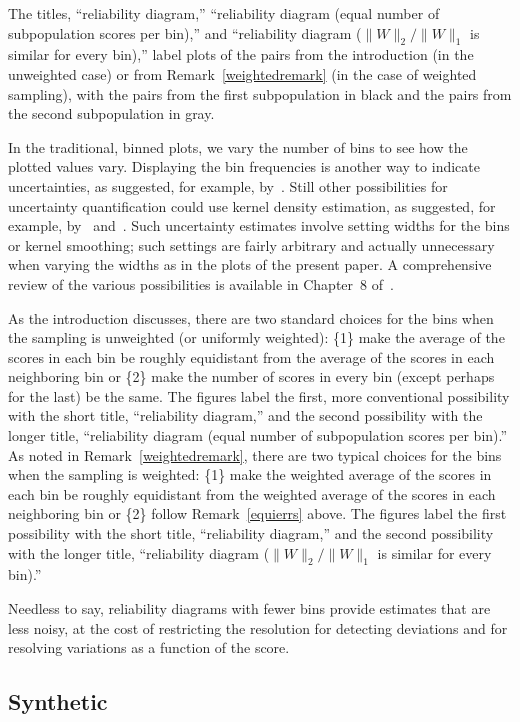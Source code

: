 \documentclass{article}
\begin{document}
The titles, ``reliability diagram,''
``reliability diagram (equal number of subpopulation scores per bin),''
and ``reliability diagram ($\|W\|_2/\|W\|_1$ is similar for every bin),''
label plots of the pairs from the introduction (in the unweighted case)
or from Remark~\ref{weightedremark} (in the case of weighted sampling),
with the pairs from the first subpopulation in black
and the pairs from the second subpopulation in gray.

In the traditional, binned plots,
we vary the number of bins to see how the plotted values vary.
Displaying the bin frequencies is another way to indicate uncertainties,
as suggested, for example, by~\cite{murphy-winkler}.
Still other possibilities for uncertainty quantification could use
kernel density estimation, as suggested, for example,
by~\cite{brocker} and~\cite{wilks}.
Such uncertainty estimates involve setting widths for the bins
or kernel smoothing; such settings are fairly arbitrary
and actually unnecessary when varying the widths as in the plots
of the present paper.
A comprehensive review of the various possibilities is available
in Chapter~8 of~\cite{wilks}.

As the introduction discusses, there are two standard choices for the bins
when the sampling is unweighted (or uniformly weighted):
\{1\} make the average of the scores in each bin
be roughly equidistant from the average of the scores
in each neighboring bin or
\{2\} make the number of scores in every bin
(except perhaps for the last) be the same.
The figures label the first, more conventional possibility
with the short title, ``reliability diagram,'' and the second possibility
with the longer title,
``reliability diagram (equal number of subpopulation scores per bin).''
As noted in Remark~\ref{weightedremark}, there are two typical choices
for the bins when the sampling is weighted:
\{1\} make the weighted average of the scores in each bin
be roughly equidistant from the weighted average of the scores
in each neighboring bin or
\{2\} follow Remark~\ref{equierrs} above.
The figures label the first possibility with the short title,
``reliability diagram,'' and the second possibility
with the longer title,
``reliability diagram ($\|W\|_2/\|W\|_1$ is similar for every bin).''

Needless to say, reliability diagrams with fewer bins provide estimates
that are less noisy, at the cost of restricting the resolution
for detecting deviations and for resolving variations
as a function of the score.


\subsection{Synthetic}
\label{synthetic}
\end{document}
